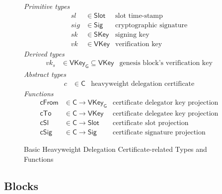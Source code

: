 \documentclass[11pt,a4paper]{article}
\newcommand{\fun}[1]{\mathsf{#1}}
\newcommand{\type}[1]{\mathsf{#1}}
\newcommand{\Slot}{\type{Slot}}
\newcommand{\HCert}{\type{C}}
\newcommand{\SKey}{\type{SKey}}
\newcommand{\VKey}{\type{VKey}}
\newcommand{\VKeyGen}{\type{VKey_G}}
\newcommand{\Sig}{\type{Sig}}
\newcommand{\totalf}{\to}
\begin{document}
\begin{figure}
  \emph{Primitive types}
  \begin{align*}
    sl & \in \Slot    & \text{slot time-stamp}\\
   sig & \in \Sig     & \text{cryptographic signature}\\
    sk & \in \SKey    & \text{signing key}\\
    vk & \in \VKey    & \text{verification key}
  \end{align*}
  \emph{Derived types}
  \begin{align*}
    vk_s & \in \VKeyGen \subseteq \VKey & \text{genesis block's verification key}
  \end{align*}
  \emph{Abstract types}
  \begin{align*}
    c & \in \HCert  & \text{heavyweight delegation certificate}
  \end{align*}
  \emph{Functions}
  \begin{align*}
    \fun{cFrom} & \in \HCert \totalf \VKeyGen & \text{certificate delegator key projection} \\
    \fun{cTo} & \in \HCert \totalf \VKey & \text{certificate delegatee key projection} \\
    \fun{cSl} & \in \HCert \totalf \Slot & \text{certificate slot projection} \\
    \fun{cSig} & \in \HCert \totalf \Sig & \text{certificate signature projection}
  \end{align*}
  \caption{Basic Heavyweight Delegation Certificate-related Types and Functions}
  \label{fig:cert-defs}
\end{figure}


\subsection{Blocks}
\label{sec:blocks}
\end{document}
